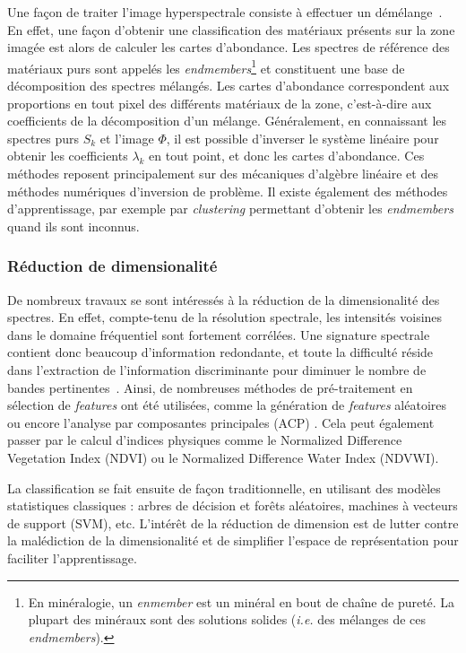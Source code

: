 Une façon de traiter l'image hyperspectrale consiste à effectuer un démélange~\cite{parra_unmixing_1999}. En effet, une façon d'obtenir une classification des matériaux présents sur la zone imagée est alors de calculer les cartes d'abondance. Les spectres de référence des matériaux purs sont appelés les \textit{endmembers}\footnote{En minéralogie, un \textit{enmember} est un minéral en bout de chaîne de pureté. La plupart des minéraux sont des solutions solides (\textit{i.e.} des mélanges de ces \textit{endmembers}).} et constituent une base de décomposition des spectres mélangés. Les cartes d'abondance correspondent aux proportions en tout pixel des différents matériaux de la zone, c'est-à-dire aux coefficients de la décomposition d'un mélange. Généralement, en connaissant les spectres purs $S_k$ et l'image $\Phi$, il est possible d'inverser le système linéaire pour obtenir les coefficients $\lambda_k$ en tout point, et donc les cartes d'abondance. Ces méthodes reposent principalement sur des mécaniques d'algèbre linéaire et des méthodes numériques d'inversion de problème. Il existe également des méthodes d'apprentissage, par exemple par \textit{clustering} permettant d'obtenir les \textit{endmembers} quand ils sont inconnus.

\subsubsection{Réduction de dimensionalité}
De nombreux travaux se sont intéressés à la réduction de la dimensionalité des spectres. En effet, compte-tenu de la résolution spectrale, les intensités voisines dans le domaine fréquentiel sont fortement corrélées. Une signature spectrale contient donc beaucoup d'information redondante, et toute la difficulté réside dans l'extraction de l'information discriminante pour diminuer le nombre de bandes pertinentes~\cite{le_bris_extraction_2015}. Ainsi, de nombreuses méthodes de pré-traitement en sélection de \textit{features} ont été utilisées, comme la génération de \textit{features} aléatoires \cite{damodaran_sparse_2017} ou encore l'analyse par composantes principales (ACP) \cite{rodarmel_principal_2002}. Cela peut également passer par le calcul d'indices physiques comme le Normalized Difference Vegetation Index (NDVI) ou le Normalized Difference Water Index (NDVWI).

La classification se fait ensuite de façon traditionnelle, en utilisant des modèles statistiques classiques : arbres de décision et forêts aléatoires, machines à vecteurs de support (SVM), etc. L'intérêt de la réduction de dimension est de lutter contre la malédiction de la dimensionalité et de simplifier l'espace de représentation pour faciliter l'apprentissage.

